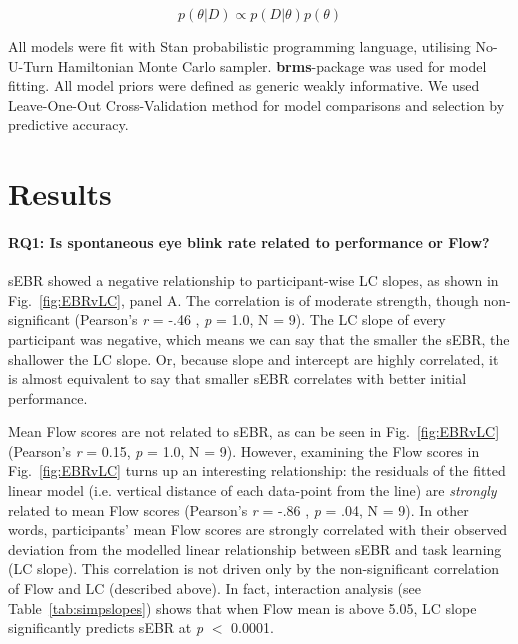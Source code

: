 \documentclass[10pt,letterpaper,floatsintext]{article}
\begin{document}
\begin{equation}
    p(\theta|D) \propto p(D|\theta)p(\theta)
\end{equation}

All models were fit with Stan probabilistic programming language, utilising No-U-Turn Hamiltonian Monte Carlo sampler. {\bf brms}-package was used for model fitting. All model priors were defined as generic weakly informative. We used Leave-One-Out Cross-Validation method for model comparisons and selection by predictive accuracy.


\section{Results}

\paragraph{RQ1: Is spontaneous eye blink rate related to performance or Flow?}

sEBR showed a negative relationship to participant-wise LC slopes, as shown in Fig.~\ref{fig:EBRvLC}, panel A. The correlation is of moderate strength, though non-significant (Pearson's {\it r} = -.46 , {\it p} = 1.0, N = 9). %
The LC slope of every participant was negative, which means we can say that the smaller the sEBR, the shallower the LC slope. Or, because slope and intercept are highly correlated, it is almost equivalent to say that smaller sEBR correlates with better initial performance.

Mean Flow scores are not related to sEBR, as can be seen in Fig.~\ref{fig:EBRvLC} (Pearson's {\it r} = 0.15, {\it p} = 1.0, N = 9). %
However, examining the Flow scores in Fig.~\ref{fig:EBRvLC} turns up an interesting relationship: the residuals of the fitted linear model (i.e. vertical distance of each data-point from the line) are {\it strongly} related to mean Flow scores (Pearson's {\it r} = -.86 , {\it p} = .04, N = 9). %
In other words, participants' mean Flow scores are strongly correlated with their observed deviation from the modelled linear relationship between sEBR and task learning (LC slope). This correlation is not driven only by the non-significant correlation of Flow and LC (described above). In fact, interaction analysis (see Table~\ref{tab:simpslopes}) shows that when Flow mean is above 5.05, LC slope significantly predicts sEBR at {\it p} $<$ 0.0001.
\end{document}
